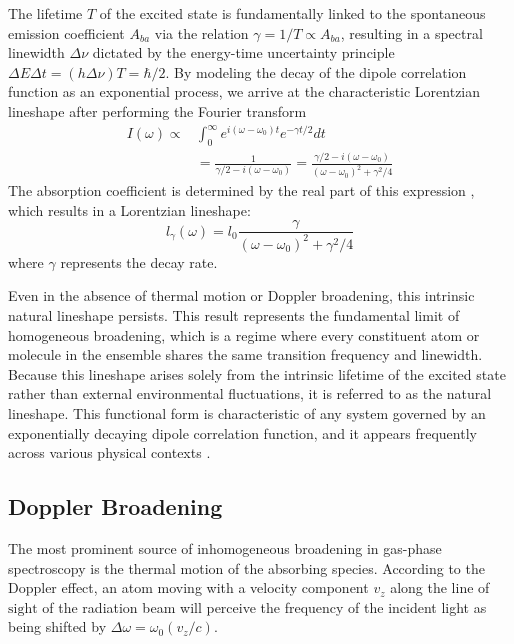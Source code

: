 \documentclass[8pt,a4paper]{report}
\begin{document}
	The lifetime $T$ of the excited state is fundamentally linked to the spontaneous emission coefficient $A_{ba}$ via the relation $\gamma = 1/T \propto A_{ba}$, resulting in a spectral linewidth $\Delta \nu$ dictated by the energy-time uncertainty principle $\Delta E \Delta t = (h\Delta \nu) T = \hbar /2$. By modeling the decay of the dipole correlation function as an exponential process, we arrive at the characteristic Lorentzian lineshape after performing the Fourier transform
	\begin{align}
		I(\omega) \propto& \int_{0}^{\infty} e^{i (\omega - \omega_0)t} e^{-\gamma t / 2} dt \nonumber\\
		&= \frac{1}{\gamma /2 - i(\omega - \omega_0)} = \frac{\gamma /2 - i(\omega - \omega_0)}{(\omega - \omega_0)^2 + \gamma^2 /4}
	\end{align}
	The absorption coefficient is determined by the real part of this expression \cite{book_molecules_and_radiation}, which results in a Lorentzian lineshape:
	\begin{equation} \label{ls_lorentzian}
		l_\gamma(\omega) = l_0 \frac{\gamma}{(\omega - \omega_0)^2 + \gamma^2/4}
	\end{equation}
	where $\gamma$ represents the decay rate.
	
	Even in the absence of thermal motion or Doppler broadening, this intrinsic natural lineshape persists. This result represents the fundamental limit of homogeneous broadening, which is a regime where every constituent atom or molecule in the ensemble shares the same transition frequency and linewidth. Because this lineshape arises solely from the intrinsic lifetime of the excited state rather than external environmental fluctuations, it is referred to as the natural lineshape. This functional form is characteristic of any system governed by an exponentially decaying dipole correlation function, and it appears frequently across various physical contexts \cite{book_foot2005atomic, book_fourier}.
	
	\subsection{Doppler Broadening}
	The most prominent source of inhomogeneous broadening in gas-phase spectroscopy is the thermal motion of the absorbing species. According to the Doppler effect, an atom moving with a velocity component $v_z$ along the line of $\text{sight}$ of the radiation beam will perceive the frequency of the incident light as being shifted by $\Delta \omega = \omega_0 (v_z/c)$. 
	
\end{document}
